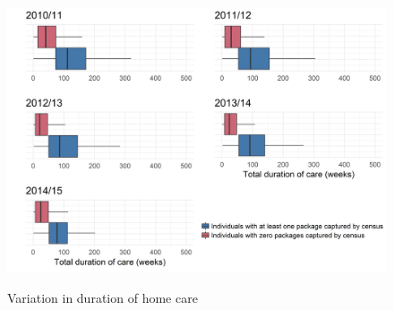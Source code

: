 \documentclass[]{article}
\begin{document}
\begin{figure}[h]
  \centering
    \caption{Variation in duration of home care}
    \includegraphics{figures/chapter-renf/17-duration.png}
    \label{fig:renf-duration}
\end{figure}
\end{document}
